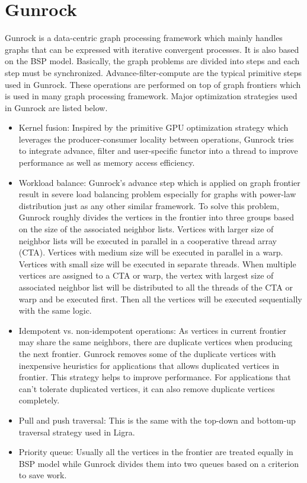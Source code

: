 \section{Gunrock}
Gunrock \cite{wang2016gunrock} is a data-centric graph processing framework which mainly handles
graphs that can be expressed with iterative convergent processes. It is also
based on the BSP model. Basically, the graph
problems are divided into steps and each step must be synchronized.
Advance-filter-compute are the typical primitive steps used in Gunrock. 
These operations are performed on top of graph frontiers which is used in many
graph processing framework. Major optimization strategies used in Gunrock are
listed below.

\begin{itemize}
    \item Kernel fusion: Inspired by the primitive GPU optimization strategy
        which leverages the producer-consumer locality between operations,
        Gunrock tries to integrate advance, filter and user-specific functor
        into a thread to improve performance as well as memory access
        efficiency.
    \item Workload balance: Gunrock's advance step which is applied on graph
        frontier result in severe load balancing problem especially for graphs
        with power-law distribution just as any other similar framework. To
        solve this problem, Gunrock roughly divides the vertices in the
        frontier into three groups based on the size of the associated neighbor
        lists. Vertices with larger size of neighbor lists will be executed in
        parallel in a cooperative thread array (CTA). Vertices with medium size
        will be executed in parallel in a warp. Vertices with small size will be
        executed in separate threads. When multiple vertices are assigned to a
        CTA or warp, the vertex with largest size of associated neighbor list
        will be distributed to all the threads of the CTA or warp and be executed
        first. Then all the vertices will be executed sequentially with the same
        logic.
    \item Idempotent vs. non-idempotent operations: As vertices in current
        frontier may share the same neighbors, there are duplicate vertices when
        producing the next frontier. Gunrock removes some of the duplicate
        vertices with inexpensive heuristics for applications that allows
        duplicated vertices in frontier. This strategy helps to improve
        performance. For applications that can't tolerate duplicated vertices,
        it can also remove duplicate vertices completely. 

    \item Pull and push traversal: This is the same with the top-down
        and bottom-up traversal strategy used in Ligra.

    \item Priority queue: Usually all the vertices in the frontier are treated
        equally in BSP model while Gunrock divides them into two queues
        based on a criterion to save work.  

\end{itemize}

